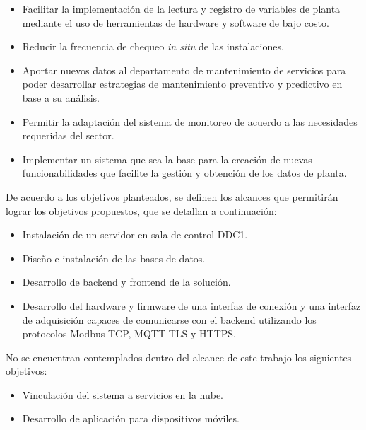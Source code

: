\begin{itemize}
	\item Facilitar la implementación de la lectura y registro de variables de planta mediante el uso de herramientas de hardware y software de bajo costo. 
	\item Reducir la frecuencia de chequeo \textit{in situ} de las instalaciones.
	\item Aportar nuevos datos al departamento de mantenimiento de servicios para poder desarrollar estrategias de mantenimiento preventivo y predictivo en base a su análisis.
	\item Permitir la adaptación del sistema de monitoreo de acuerdo a las necesidades requeridas del sector.
	\item Implementar un sistema que sea la base para la creación de nuevas funcionabilidades que facilite la gestión y obtención de los datos de planta. \\ 
\end{itemize}

De acuerdo a los objetivos planteados, se definen los alcances que permitirán lograr los objetivos propuestos, que se detallan a continuación:\\ 

\begin{itemize}
 
	\item Instalación de un servidor en sala de control DDC1.
	\item Diseño e instalación de las bases de datos.
	\item Desarrollo de backend y frontend de la solución.
	\item Desarrollo del hardware y firmware de una interfaz de conexión y una interfaz de adquisición capaces de comunicarse con el backend utilizando los protocolos Modbus TCP, MQTT TLS y HTTPS.\\ 
	
\end{itemize}

No se encuentran contemplados dentro del alcance de este trabajo los siguientes objetivos:\\ 

\begin{itemize}
	\item Vinculación del sistema a servicios en la nube.
	\item Desarrollo de aplicación para dispositivos móviles.
\end{itemize}


